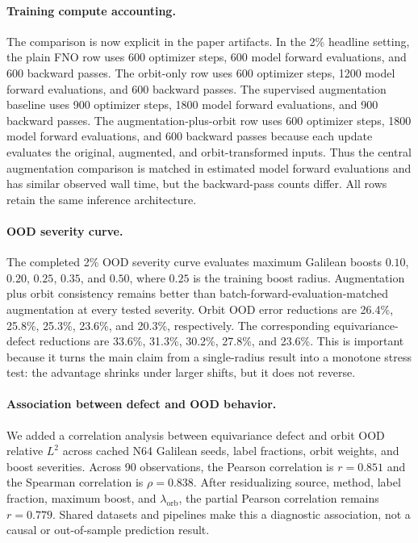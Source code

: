 \paragraph{Training compute accounting.} The comparison is now explicit in the paper artifacts. In the 2\% headline setting, the plain FNO row uses 600 optimizer steps, 600 model forward evaluations, and 600 backward passes. The orbit-only row uses 600 optimizer steps, 1200 model forward evaluations, and 600 backward passes. The supervised augmentation baseline uses 900 optimizer steps, 1800 model forward evaluations, and 900 backward passes. The augmentation-plus-orbit row uses 600 optimizer steps, 1800 model forward evaluations, and 600 backward passes because each update evaluates the original, augmented, and orbit-transformed inputs. Thus the central augmentation comparison is matched in estimated model forward evaluations and has similar observed wall time, but the backward-pass counts differ. All rows retain the same inference architecture.

\paragraph{OOD severity curve.} The completed 2\% OOD severity curve evaluates maximum Galilean boosts \(0.10\), \(0.20\), \(0.25\), \(0.35\), and \(0.50\), where \(0.25\) is the training boost radius. Augmentation plus orbit consistency remains better than batch-forward-evaluation-matched augmentation at every tested severity. Orbit OOD error reductions are 26.4\%, 25.8\%, 25.3\%, 23.6\%, and 20.3\%, respectively. The corresponding equivariance-defect reductions are 33.6\%, 31.3\%, 30.2\%, 27.8\%, and 23.6\%. This is important because it turns the main claim from a single-radius result into a monotone stress test: the advantage shrinks under larger shifts, but it does not reverse.

\paragraph{Association between defect and OOD behavior.} We added a correlation analysis between equivariance defect and orbit OOD relative \(L^2\) across cached N64 Galilean seeds, label fractions, orbit weights, and boost severities. Across 90 observations, the Pearson correlation is \(r=0.851\) and the Spearman correlation is \(\rho=0.838\). After residualizing source, method, label fraction, maximum boost, and \(\lambda_{\mathrm{orb}}\), the partial Pearson correlation remains \(r=0.779\). Shared datasets and pipelines make this a diagnostic association, not a causal or out-of-sample prediction result.

